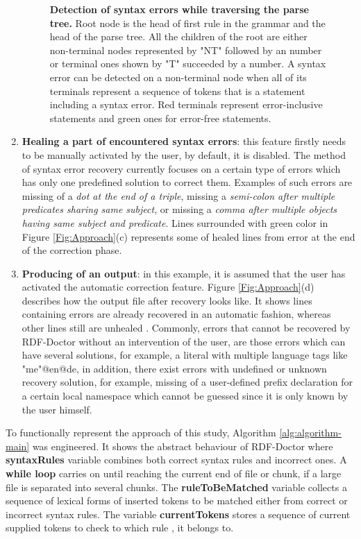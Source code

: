 \begin{enumerate}[label=(\alph*)]
\begin{figure}
		\caption{\textbf{Detection of syntax errors while traversing the parse tree.} 
		Root node is the head of first rule in the grammar and the head of the parse tree.
		All the children of the root are either non-terminal nodes represented by "NT" followed by an number or  terminal ones shown by "T" succeeded by a number. 
		A syntax error can be detected on a non-terminal node when all of its terminals represent a sequence of tokens that is a statement including a syntax error. Red terminals represent error-inclusive statements and green ones for error-free statements.}
		\label{Fig:approachParseTree}  
\end{figure}

\item \textbf {Healing a part of encountered syntax errors}: this feature firstly needs to be manually activated by the user, by default, it is disabled. The method of  syntax error recovery currently focuses on a certain type of errors which has only one predefined solution to correct them. Examples of such errors are  missing of a \emph{dot at the end of a triple}, missing a \emph{semi-colon after multiple predicates sharing same subject}, or missing a \emph{comma after multiple objects having same subject and predicate}. Lines surrounded with green color in {Figure \ref{Fig:Approach}}(c) represents some of healed lines from error at the end of the correction phase. 

\item\textbf {Producing of an output}: in this example, it is assumed that the user has activated the automatic correction feature.  
{Figure \ref{Fig:Approach}}(d) describes how the output file after recovery  looks like. It shows lines containing errors are already recovered in an automatic fashion, whereas other  lines still are unhealed .
Commonly, errors that cannot be recovered by RDF-Doctor without an intervention of the user, are those errors which can have several solutions, for example, a literal with multiple language tags like "me"@en@de, in addition, there exist errors with undefined or unknown recovery solution, for example, missing of a user-defined prefix declaration for a certain local namespace which cannot be guessed since it is only known by the user himself. 
\end{enumerate} 



To functionally represent the approach of this study, Algorithm \ref{alg:algorithm-main} was engineered. 
It shows the abstract behaviour of RDF-Doctor where \textbf{syntaxRules} variable combines both correct syntax rules and incorrect ones. 
A \textbf{while loop} carries on until reaching the current end of file or chunk, if a large file is separated into several chunks. 
The \textbf{ruleToBeMatched} variable collects a sequence of lexical forms of inserted tokens to be matched either from correct or incorrect syntax rules. The variable \textbf{currentTokens} stores a sequence of current supplied tokens to check to which rule , it belongs to.  

